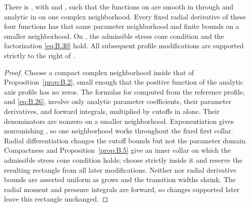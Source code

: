 \begin{corollary}\label{cor:B.6}
There is , with  and
, such that the functions
 on
 are smooth in
 through  and analytic in
 on one complex neighborhood. Every fixed radial derivative of these four functions has that same
parameter neighborhood and finite bounds on a smaller neighborhood. On
, the admissible stress cone condition and the factorization
\eqref{eq:B.30} hold. All subsequent profile modifications are supported strictly to the right of
.
\end{corollary}
\begin{proof}
Choose a compact complex neighborhood inside that of Proposition~\ref{prop:B.2}, small enough that the positive function
 of the analytic axis profile has no zeros. The formulas for
 computed from the reference profile, and \eqref{eq:B.26}, involve only analytic parameter coefficients,
their parameter derivatives, and forward integrals, multiplied by cutoffs in  alone. Their
denominators are nonzero on a smaller neighborhood. Exponentiation gives nonvanishing
, so one neighborhood works throughout the fixed first collar. Radial differentiation changes
the cutoff bounds but not the parameter domain. Compactness and Proposition~\ref{prop:B.5} give an inner collar on which the admissible stress cone condition holds; choose
 strictly inside it and reserve the resulting rectangle from all later modifications. Neither
 nor radial derivative bounds are asserted uniform as  grows and the transition widths shrink. The
radial moment and pressure integrals are forward, so changes supported later leave this
rectangle unchanged.
\end{proof}

%

